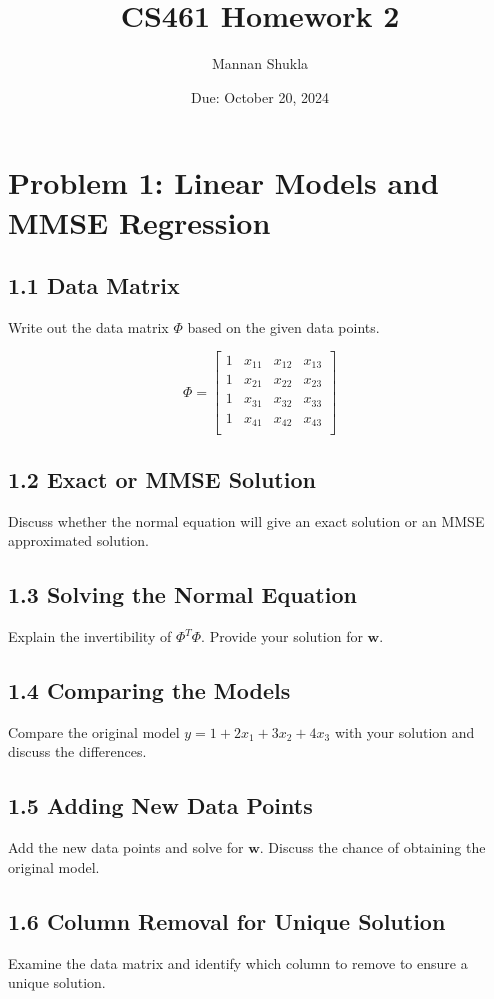 \documentclass[12pt]{article}
\title{CS461 Homework 2}
\author{Mannan Shukla}
\date{Due: October 20, 2024}
\begin{document}
\maketitle

\section*{Problem 1: Linear Models and MMSE Regression}

\subsection*{1.1 Data Matrix}
Write out the data matrix \( \Phi \) based on the given data points.

\[
\Phi = \begin{bmatrix}
1 & x_{11} & x_{12} & x_{13} \\
1 & x_{21} & x_{22} & x_{23} \\
1 & x_{31} & x_{32} & x_{33} \\
1 & x_{41} & x_{42} & x_{43} \\
\end{bmatrix}
\]

\subsection*{1.2 Exact or MMSE Solution}
Discuss whether the normal equation will give an exact solution or an MMSE approximated solution.

\subsection*{1.3 Solving the Normal Equation}
Explain the invertibility of \( \Phi^T \Phi \). Provide your solution for \( \mathbf{w} \).

\subsection*{1.4 Comparing the Models}
Compare the original model \( y = 1 + 2x_1 + 3x_2 + 4x_3 \) with your solution and discuss the differences.

\subsection*{1.5 Adding New Data Points}
Add the new data points and solve for \( \mathbf{w} \). Discuss the chance of obtaining the original model.

\subsection*{1.6 Column Removal for Unique Solution}
Examine the data matrix and identify which column to remove to ensure a unique solution.
\end{document}
